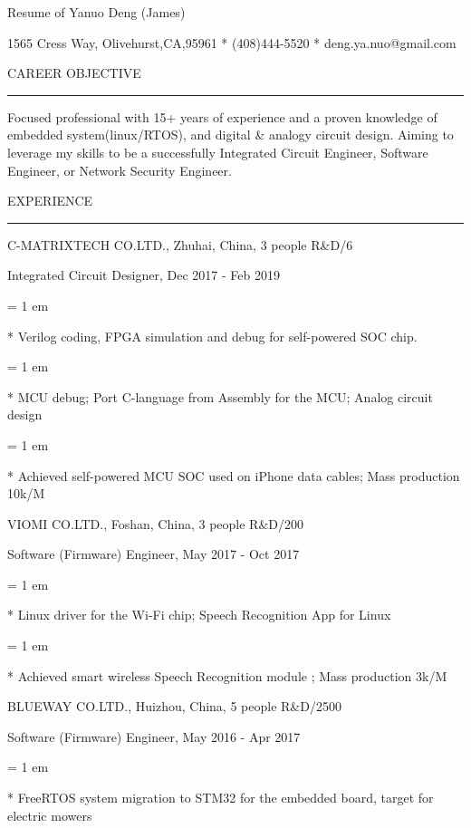 

\centerline{ \FFbg
Resume of Yanuo Deng (James)
}

\centerline{ %
1565 Cress Way, Olivehurst,CA,95961
*
(408)444-5520
*
deng.ya.nuo@gmail.com
}

{ \medbreak } { \FFbg
CAREER OBJECTIVE
}

{ \smallbreak } {\par\noindent\hrule} { \smallbreak }

    Focused professional with 15+ years of experience
and a proven knowledge of embedded system(linux/RTOS),
and digital \& analogy circuit design.
    Aiming to leverage my skills to be a successfully
Integrated Circuit Engineer,
Software Engineer,
or Network Security Engineer.

{ \medbreak } { \FFbg
EXPERIENCE
}
{ \smallbreak } {\par\noindent\hrule} { \smallbreak }

{ \medbreak } { \FFbg
C-MATRIXTECH CO.LTD., Zhuhai, China, 3 people R\&D/6
}

{ \FFte
Integrated Circuit Designer, Dec 2017 - Feb 2019
}

{ \parindent = 1 em \item{*}
 Verilog coding, FPGA simulation and debug for self-powered SOC chip.
}

{ \parindent = 1 em \item{*}
 MCU debug; Port C-language from Assembly for the MCU; Analog circuit design
}
{ \parindent = 1 em \item{*}
 Achieved self-powered MCU SOC used on iPhone data cables; Mass production 10k/M
}

{ \medbreak } { \FFbg
VIOMI CO.LTD., Foshan, China, 3 people R\&D/200
}

{ \FFte
Software (Firmware) Engineer, May 2017 - Oct 2017
}

{ \parindent = 1 em \item{*}
 Linux driver for the Wi-Fi chip; Speech Recognition App for Linux
 }
{ \parindent = 1 em \item{*}
 Achieved smart wireless Speech Recognition module ; Mass production 3k/M
 }

{ \medbreak } { \FFbg
BLUEWAY CO.LTD., Huizhou, China, 5 people R\&D/2500
}

{ \FFte
Software (Firmware) Engineer, May 2016 - Apr 2017
}
{ \parindent = 1 em \item{*}
 FreeRTOS system migration to STM32 for the embedded board, target for electric mowers
 }

